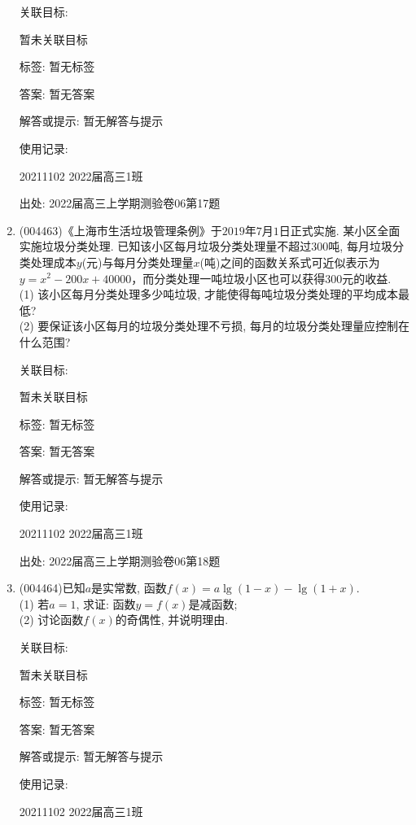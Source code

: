 \documentclass[10pt,a4paper]{article}
\begin{document}
\begin{enumerate}[1.]
关联目标:

暂未关联目标



标签: 暂无标签

答案: 暂无答案

解答或提示: 暂无解答与提示

使用记录:

20211102	2022届高三1班		


出处: 2022届高三上学期测验卷06第17题
\item { (004463)}《上海市生活垃圾管理条例》于$2019$年$7$月$1$日正式实施. 某小区全面实施垃圾分类处理. 已知该小区每月垃圾分类处理量不超过$300$吨, 每月垃圾分类处理成本$y$(元)与每月分类处理量$x$(吨)之间的函数关系式可近似表示为
$y=x^2-200x+40000$，而分类处理一吨垃圾小区也可以获得$300$元的收益.\\
(1) 该小区每月分类处理多少吨垃圾, 才能使得每吨垃圾分类处理的平均成本最低?\\
(2) 要保证该小区每月的垃圾分类处理不亏损, 每月的垃圾分类处理量应控制在什么范围?


关联目标:

暂未关联目标



标签: 暂无标签

答案: 暂无答案

解答或提示: 暂无解答与提示

使用记录:

20211102	2022届高三1班		


出处: 2022届高三上学期测验卷06第18题
\item { (004464)}已知$a$是实常数, 函数$f(x)=a\lg(1-x)-\lg (1+x)$.\\
(1) 若$a=1$, 求证: 函数$y=f(x)$是减函数;\\
(2) 讨论函数$f(x)$的奇偶性, 并说明理由.


关联目标:

暂未关联目标



标签: 暂无标签

答案: 暂无答案

解答或提示: 暂无解答与提示

使用记录:

20211102	2022届高三1班		



\end{enumerate}
\end{document}
